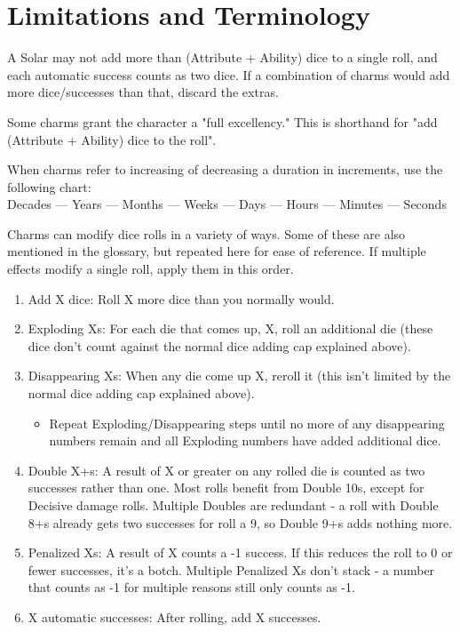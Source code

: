 \documentclass[oneside]{book}
\begin{document}
\section*{Limitations and Terminology}
\begin{multicols}{2}
\par A Solar may not add more than (Attribute + Ability) dice to a single roll, and each automatic success counts as two dice. If a combination of charms would add more dice/successes than that, discard the extras.
\par Some charms grant the character a "full excellency." This is shorthand for "add (Attribute + Ability) dice to the roll".

\par  When charms refer to increasing of decreasing a duration in increments, use the following chart: \\
    Decades --- Years --- Months --- Weeks --- Days --- Hours --- Minutes --- Seconds

\par Charms can modify dice rolls in a variety of ways. Some of these are also mentioned in the glossary, but repeated here for ease of reference. If multiple effects modify a single roll, apply them in this order.
  \begin{enumerate}
    \item Add X dice: Roll X more dice than you normally would.
    \item Exploding Xs: For each die that comes up, X, roll an additional die (these dice don't count against the normal dice adding cap explained above).
    \item Disappearing Xs: When any die come up X, reroll it (this isn't limited by the normal dice adding cap explained above).
    \begin{itemize}
      \item Repeat Exploding/Disappearing steps until no more of any disappearing numbers remain and all Exploding numbers have added additional dice.\
    \end{itemize}
    \item Double X+s: A result of X or greater on any rolled die is counted as two successes rather than one. Most rolls benefit from Double 10s, except for Decisive damage rolls. Multiple Doubles are redundant - a roll with Double 8+s already gets two successes for roll a 9, so Double 9+s adds nothing more.
    \item Penalized Xs: A result of X counts a -1 success. If this reduces the roll to 0 or fewer successes, it's a botch. Multiple Penalized Xs don't stack - a number that counts as -1 for multiple reasons still only counts as -1.
    \item X automatic successes: After rolling, add X successes.
  \end{enumerate}


\end{multicols}
\end{document}
